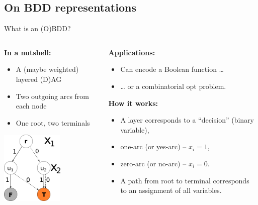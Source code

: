 \documentclass[10pt, xcolor=svgnames]{beamer}
\begin{document}
\subsection{On BDD representations}
\label{sec:org519b210}
\begin{frame}[label={sec:org709f7f3}]{What is an (O)BDD?}
\begin{columns}
\begin{column}[t]{0.40\columnwidth}
\textbf{In a nutshell:}
\begin{itemize}
\item A (maybe weighted) layered (D)AG
\item Two outgoing arcs from each node
\item One root, two terminals\vspace{2ex}
\end{itemize}

\includegraphics[width=0.6\textwidth]{./img/simple-BDD.png}
\end{column}
\begin{column}[t]{0.5\columnwidth}
\textbf{Applications:}
\begin{itemize}
\item Can encode a Boolean function \ldots{}
\item \ldots{} or a combinatorial opt problem.
\end{itemize}

\textbf{How it works:}
\begin{itemize}
\item A layer corresponds to a ``decision'' (binary variable),
\item \alert{one-arc} (or yes-arc) -- \(x_i=1\),
\item \alert{zero-arc} (or no-arc) -- \(x_i=0\).
\item A \alert{path} from root to terminal corresponds to an assignment of all
variables.
\end{itemize}
\end{column}
\end{columns}
\end{frame}
\end{document}
